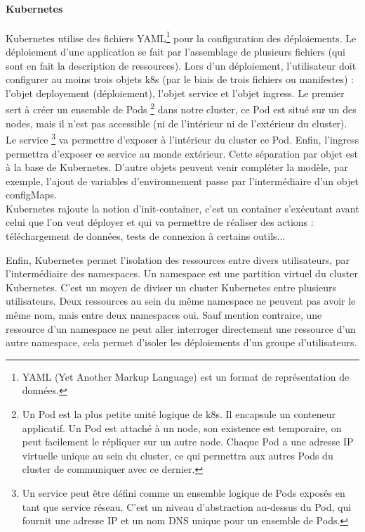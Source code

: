 \documentclass[11pt,fleqn]{book} %
\begin{document}
\paragraph{Kubernetes}
Kubernetes utilise des fichiers YAML\footnote{YAML (Yet Another Markup Language) est un format de représentation de données.} pour la configuration des déploiements. Le déploiement d'une application se fait par l'assemblage de plusieurs fichiers (qui sont en fait la description de ressources). Lors d'un déploiement, l'utilisateur doit configurer au moins trois objets k8s (par le biais de trois fichiers ou manifestes) : l'objet deployement (déploiement), l'objet service et l'objet ingress. Le premier sert à créer un ensemble de Pods \footnote{Un Pod est la plus petite unité logique de k8s. Il encapsule un conteneur applicatif. Un Pod est attaché à un node, son existence est temporaire, on peut facilement le répliquer sur un autre node. Chaque Pod a une adresse IP virtuelle unique au sein du cluster, ce qui permettra aux autres Pods du cluster de communiquer avec ce dernier.} dans notre cluster, ce Pod est situé sur un des nodes, mais il n'est pas accessible (ni de l'intérieur ni de l'extérieur du cluster). Le service \footnote{Un service peut être défini comme un ensemble logique de Pods exposés en tant que service réseau. C'est un niveau d'abstraction au-dessus du Pod, qui fournit une adresse IP et un nom DNS unique pour un ensemble de Pods.} va permettre d'exposer à l'intérieur du cluster ce Pod. Enfin, l'ingress permettra d'exposer ce service au monde extérieur. Cette séparation par objet est à la base de Kubernetes. D'autre objets peuvent venir compléter la modèle, par exemple, l'ajout de variables d'environnement passe par l'intermédiaire d'un objet configMaps.\\

Kubernetes rajoute la notion d'init-container, c'est un container s'exécutant avant celui que l'on veut déployer et qui va permettre de réaliser des actions : téléchargement de données, tests de connexion à certains outils... \newline


Enfin, Kubernetes permet l'isolation des ressources entre divers utilisateurs, par l'intermédiaire des namespaces. Un namespace est une partition virtuel du cluster Kubernetes. C’est un moyen de diviser un cluster Kubernetes entre plusieurs utilisateurs. Deux ressources au sein du même namespace ne peuvent pas avoir le même nom, mais entre deux namespaces oui. Sauf mention contraire, une ressource d’un namespace ne peut aller interroger directement une ressource d’un autre namespace, cela permet d’isoler les déploiements d’un groupe d’utilisateurs.
\end{document}
